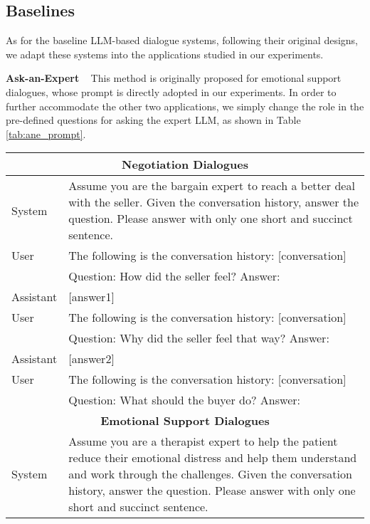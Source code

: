 \documentclass{article} %
\begin{document}
\subsection{Baselines}\label{app:baseline_prompt}

As for the baseline LLM-based dialogue systems, following their original designs, we adapt these systems into the applications studied in our experiments. 

\noindent \textbf{Ask-an-Expert} \citep{acl23-askanexpert} ~ 
This method is originally proposed for emotional support dialogues, whose prompt is directly adopted in our experiments. 
In order to further accommodate the other two applications, we simply change the role in the pre-defined questions for asking the expert LLM, as shown in Table \ref{tab:ane_prompt}. 

\begin{table}[h]
    \centering
    \begin{tabular}{lp{11cm}}
    \toprule
    \multicolumn{2}{c}{\textbf{Negotiation Dialogues}}\\
    \midrule
    System   &  Assume you are the bargain expert to reach a better deal with the seller. Given the conversation history, answer the question. Please answer with only one short and succinct sentence.\\
    \midrule
    User    &  The following is the conversation history: [conversation]\\
    & Question: How did the seller feel? Answer:  \\
    \midrule
    Assistant& [answer1] \\
    \midrule
    User    &  The following is the conversation history: [conversation]\\
    & Question: Why did the seller feel that way? Answer:  \\
    \midrule
    Assistant & [answer2] \\
    \midrule
    User    &  The following is the conversation history: [conversation]\\
    & Question: What should the buyer do? Answer:   \\
    \midrule
    \midrule
    \multicolumn{2}{c}{\textbf{Emotional Support Dialogues}}\\
    \midrule
    System   &  Assume you are a therapist expert to help the patient reduce their emotional distress and help them understand and work through the challenges. Given the conversation history, answer the question. Please answer with only one short and succinct sentence. \\

\end{tabular}
\end{table}
\end{document}
